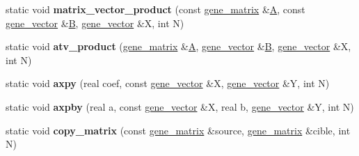 \begin{DoxyCompactItemize}
\item 
\mbox{\label{classeigen2__interface_a2bfb81f6567e0819babd15800f1f4729}} 
static void {\bfseries matrix\+\_\+vector\+\_\+product} (const \hyperlink{group___core___module_class_eigen_1_1_matrix}{gene\+\_\+matrix} \&\hyperlink{group___core___module_class_eigen_1_1_matrix}{A}, const \hyperlink{group___core___module_class_eigen_1_1_matrix}{gene\+\_\+vector} \&\hyperlink{group___core___module_class_eigen_1_1_matrix}{B}, \hyperlink{group___core___module_class_eigen_1_1_matrix}{gene\+\_\+vector} \&X, int N)
\item 
\mbox{\label{classeigen2__interface_a08e97274a67f0518ab70dee741e9671b}} 
static void {\bfseries atv\+\_\+product} (\hyperlink{group___core___module_class_eigen_1_1_matrix}{gene\+\_\+matrix} \&\hyperlink{group___core___module_class_eigen_1_1_matrix}{A}, \hyperlink{group___core___module_class_eigen_1_1_matrix}{gene\+\_\+vector} \&\hyperlink{group___core___module_class_eigen_1_1_matrix}{B}, \hyperlink{group___core___module_class_eigen_1_1_matrix}{gene\+\_\+vector} \&X, int N)
\item 
\mbox{\label{classeigen2__interface_a75284d18aaae0302e1af69e565344ba3}} 
static void {\bfseries axpy} (real coef, const \hyperlink{group___core___module_class_eigen_1_1_matrix}{gene\+\_\+vector} \&X, \hyperlink{group___core___module_class_eigen_1_1_matrix}{gene\+\_\+vector} \&Y, int N)
\item 
\mbox{\label{classeigen2__interface_a1fdb8844451933d63ddafab018794229}} 
static void {\bfseries axpby} (real a, const \hyperlink{group___core___module_class_eigen_1_1_matrix}{gene\+\_\+vector} \&X, real b, \hyperlink{group___core___module_class_eigen_1_1_matrix}{gene\+\_\+vector} \&Y, int N)
\item 
\mbox{\label{classeigen2__interface_ac35b735243a2dc3d2e37da6e9afe9926}} 
static void {\bfseries copy\+\_\+matrix} (const \hyperlink{group___core___module_class_eigen_1_1_matrix}{gene\+\_\+matrix} \&source, \hyperlink{group___core___module_class_eigen_1_1_matrix}{gene\+\_\+matrix} \&cible, int N)
\item 
\mbox{\label{classeigen2__interface_abfbfd12c87618995b009f08550ae2047}} 

\end{DoxyCompactItemize}
